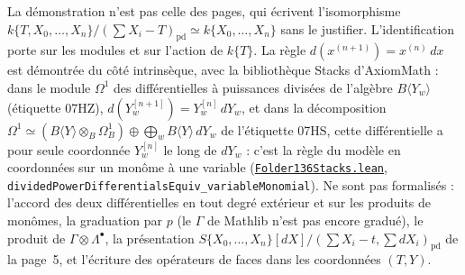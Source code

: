 {\small La démonstration n'est pas celle des pages, qui écrivent l'isomorphisme $k\{T, X_0, \ldots, X_n\}/(\sum X_i - T)_{\mathrm{pd}} \simeq k\{X_0, \ldots, X_n\}$ sans le justifier. L'identification porte sur les modules et sur l'action de $k\{T\}$. La règle $d(x^{(n+1)}) = x^{(n)}\,dx$ est démontrée du côté intrinsèque, avec la bibliothèque Stacks d'AxiomMath \cite{axiomstacks} : dans le module $\Omega^1$ des différentielles à puissances divisées de l'algèbre $B\langle Y_w \rangle$ (étiquette 07HZ), $d(Y_w^{[n+1]}) = Y_w^{[n]}\,dY_w$, et dans la décomposition $\Omega^1 \simeq (B\langle Y\rangle \otimes_B \Omega^1_B) \oplus \bigoplus_w B\langle Y\rangle\,dY_w$ de l'étiquette 07HS, cette différentielle a pour seule coordonnée $Y_w^{[n]}$ le long de $dY_w$ : c'est la règle du modèle en coordonnées sur un monôme à une variable (\href{https://github.com/Commutator-IO/GrothendieckArchivesProofs/blob/main/Grothendieck/RingTheory/Folder136Stacks.lean}{\texttt{Folder136Stacks.\allowbreak{}lean}}, \texttt{dividedPowerDifferentialsEquiv\_variableMonomial}). Ne sont pas formalisés : l'accord des deux différentielles en tout degré extérieur et sur les produits de monômes, la graduation par $p$ (le $\Gamma$ de Mathlib n'est pas encore gradué), le produit de $\Gamma \otimes \Lambda^\bullet$, la présentation $S\{X_0, \ldots, X_n\}[dX]/(\sum X_i - t, \sum dX_i)_{\mathrm{pd}}$ de la page~5, et l'écriture des opérateurs de faces dans les coordonnées $(T, Y)$.\par}

